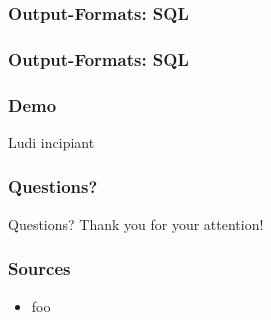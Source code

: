 \documentclass{beamer}
\begin{document}
\begin{frame}
    \frametitle{Output-Formats: SQL}
    
\end{frame}

\begin{frame}
    \frametitle{Output-Formats: SQL}
    
\end{frame}

\begin{frame}
    \frametitle{Demo}
    \begin{center}
        Ludi incipiant
    \end{center}
\end{frame}

\begin{frame}
    \frametitle{Questions?}
    \begin{center}
    Questions?
    \newline Thank you for your attention!
    \end{center}
\end{frame}

\begin{frame}
    \frametitle{Sources}
    \begin{itemize}
        \item foo
    \end{itemize}
\end{frame}
\end{document}
